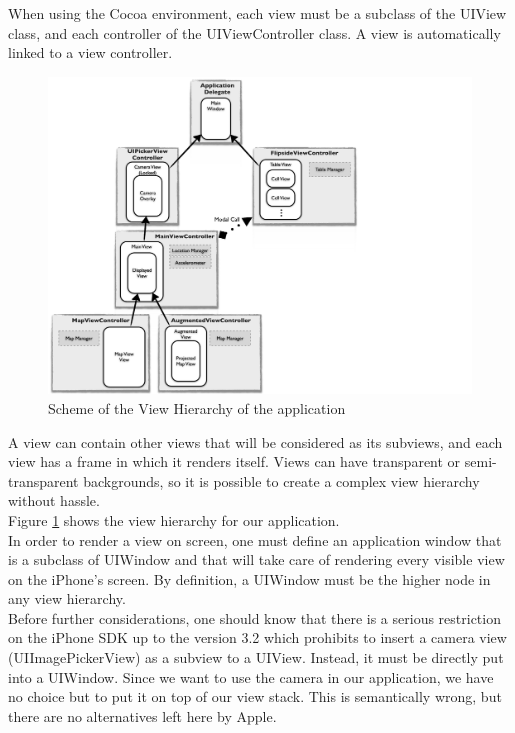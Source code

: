 When using the Cocoa environment, each view must be a subclass of the UIView class, and each controller of the UIViewController class. A view is automatically linked to a view controller.\\

\begin{figure}[ht]
\center
\includegraphics[scale=0.5]{pics/client_view_hierarchy}
\caption{Scheme of the View Hierarchy of the application}
\label{fig:client_view_hierarchy}
\end{figure}

A view can contain other views that will be considered as its subviews, and each view has a frame in which it renders itself. Views can have transparent or semi-transparent backgrounds, so it is possible to create a complex view hierarchy without hassle.\\

Figure \ref{fig:client_view_hierarchy} shows the view hierarchy for our application.\\

In order to render a view on screen, one must define an application window that is a subclass of UIWindow and that will take care of rendering every visible view on the iPhone's screen. By definition, a UIWindow must be the higher node in any view hierarchy.\\

Before further considerations, one should know that there is a serious restriction on the iPhone SDK up to the version 3.2 which prohibits to insert a camera view (UIImagePickerView) as a subview to a UIView. Instead, it must be directly put into a UIWindow. Since we want to use the camera in our application, we have no choice but to put it on top of our view stack. This is semantically wrong, but there are no alternatives left here by Apple.\\

